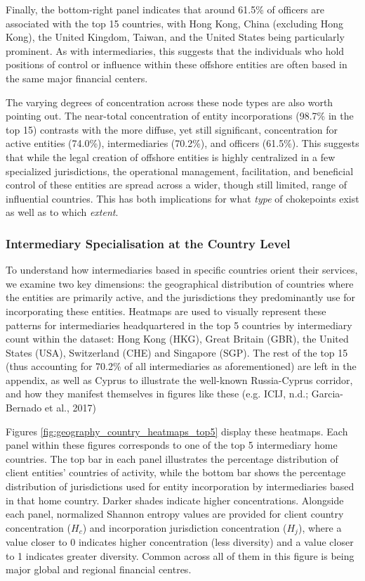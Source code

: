 Finally, the bottom-right panel indicates that around 61.5\% of officers are associated with the top 15 countries, with Hong Kong, China (excluding Hong Kong), the United Kingdom, Taiwan, and the United States being particularly prominent. As with intermediaries, this suggests that the individuals who hold positions of control or influence within these offshore entities are often based in the same major financial centers.

The varying degrees of concentration across these node types are also worth pointing out. The near-total concentration of entity incorporations (98.7\% in the top 15) contrasts with the more diffuse, yet still significant, concentration for active entities (74.0\%), intermediaries (70.2\%), and officers (61.5\%). This suggests that while the legal creation of offshore entities is highly centralized in a few specialized jurisdictions, the operational management, facilitation, and beneficial control of these entities are spread across a wider, though still limited, range of influential countries. This has both implications for what \textit{type} of chokepoints exist as well as to which \textit{extent}.


\subsubsection{Intermediary Specialisation at the Country Level}
\label{subsubsec:intermediary_specialisation_country}

To understand how intermediaries based in specific countries orient their services, we examine two key dimensions: the geographical distribution of countries where the entities are primarily active, and the jurisdictions they predominantly use for incorporating these entities. Heatmaps are used to visually represent these patterns for intermediaries headquartered in the top 5 countries by intermediary count within the dataset: Hong Kong (HKG), Great Britain (GBR), the United States (USA), Switzerland (CHE) and Singapore (SGP). The rest of the top 15 (thus accounting for 70.2\% of all intermediaries as aforementioned) are left in the appendix, as well as Cyprus to illustrate the well-known Russia-Cyprus corridor, and how they manifest themselves in figures like these (e.g. ICIJ, n.d.; Garcia-Bernado et al., 2017) 

Figures \ref{fig:geography_country_heatmaps_top5} display these heatmaps. Each panel within these figures corresponds to one of the top 5 intermediary home countries. The top bar in each panel illustrates the percentage distribution of client entities' countries of activity, while the bottom bar shows the percentage distribution of jurisdictions used for entity incorporation by intermediaries based in that home country. Darker shades indicate higher concentrations. Alongside each panel, normalized Shannon entropy values are provided for client country concentration ($H_c$) and incorporation jurisdiction concentration ($H_j$), where a value closer to 0 indicates higher concentration (less diversity) and a value closer to 1 indicates greater diversity. Common across all of them in this figure is being major global and regional financial centres.

